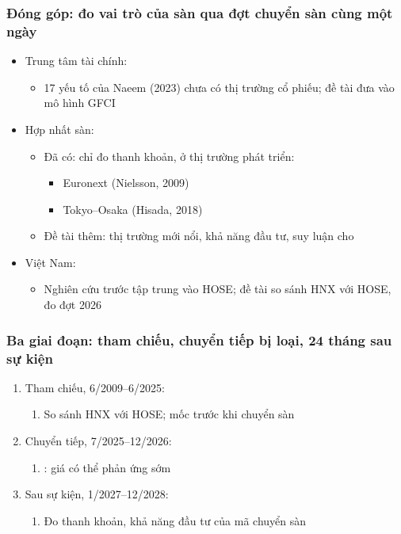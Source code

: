 \documentclass[11pt, xcolor={dvipsnames}, aspectratio=169, usepdftitle=false]{beamer}
\begin{document}
\begin{frame}
\frametitle{Đóng góp: đo vai trò của sàn qua đợt chuyển sàn cùng một ngày}
\begin{itemize}
\item Trung tâm tài chính:
\begin{itemize}
\item 17 yếu tố của Naeem (2023) chưa có thị trường cổ phiếu; đề tài đưa vào mô hình GFCI
\end{itemize}
\item Hợp nhất sàn:
\begin{itemize}
\item Đã có: chỉ đo thanh khoản, ở thị trường phát triển:
\begin{itemize}
\item Euronext (Nielsson, 2009)
\item Tokyo--Osaka (Hisada, 2018)
\end{itemize}
\item Đề tài thêm: thị trường mới nổi, khả năng đầu tư, suy luận cho 
\end{itemize}
\item Việt Nam:
\begin{itemize}
\item Nghiên cứu trước tập trung vào HOSE; đề tài so sánh HNX với HOSE, đo đợt 2026
\end{itemize}
\end{itemize}
\end{frame}

\begin{frame}
\end{frame}

\begin{frame}[label=giaiDoan]
\frametitle{Ba giai đoạn: tham chiếu, chuyển tiếp bị loại, 24 tháng sau sự kiện}
\begin{enumerate}
\item Tham chiếu, 6/2009--6/2025:
\begin{enumerate}
\item So sánh HNX với HOSE; mốc trước khi chuyển sàn
\end{enumerate}
\item Chuyển tiếp, 7/2025--12/2026:
\begin{enumerate}
\item {}: giá có thể phản ứng sớm
\end{enumerate}
\item Sau sự kiện, 1/2027--12/2028:
\begin{enumerate}
\item Đo thanh khoản, khả năng đầu tư của mã chuyển sàn
\end{enumerate}
\end{enumerate}
\end{frame}
\end{document}
